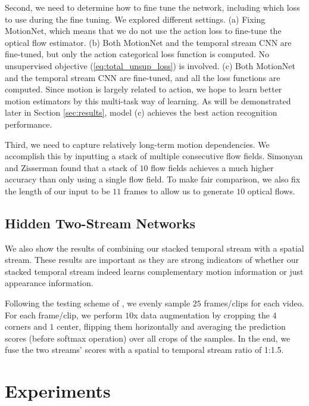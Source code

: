 \documentclass[runningheads]{llncs}
\begin{document}
		Second, we need to determine how to fine tune the network, including which loss to use during the fine tuning. We explored different settings. (a) Fixing MotionNet, which means that we do not use the action loss to fine-tune the optical flow estimator. (b) Both MotionNet and the temporal stream CNN are fine-tuned, but only the action categorical loss function is computed. No unsupervised objective (\ref{eq:total_unsup_loss}) is involved. (c) Both MotionNet and the temporal stream CNN are fine-tuned, and all the loss functions are computed. Since motion is largely related to action, we hope to learn better motion estimators by this multi-task way of learning. As will be demonstrated later in Section \ref{sec:results}, model (c) achieves the best action recognition performance. 
		
		Third, we need to capture relatively long-term motion dependencies. We accomplish this by inputting a stack of multiple consecutive flow fields. Simonyan and Zisserman \cite{twostream2014} found that a stack of $10$ flow fields achieves a much higher accuracy than only using a single flow field. To make fair comparison, we also fix the length of our input to be $11$ frames to allow us to generate $10$ optical flows.
		
		\subsection{Hidden Two-Stream Networks}
		\label{sec:hidden}
		
		We also show the results of combining our stacked temporal stream with a spatial stream. These results are important as they are strong indicators of whether our stacked temporal stream indeed learns complementary motion information or just appearance information. 
		
		Following the testing scheme of \cite{twostream2014,wanggoodpractice2015}, we evenly sample $25$ frames/clips for each video. For each frame/clip, we perform $10$x data augmentation by cropping the $4$ corners and $1$ center, flipping them horizontally and averaging the prediction scores (before softmax operation) over all crops of the samples. In the end, we fuse the two streams' scores with a spatial to temporal stream ratio of 1:1.5.
		
		
		\section{Experiments}
		\label{sec:experiments}
		
\end{document}
